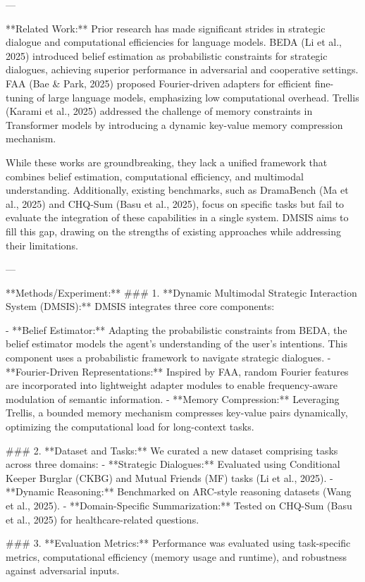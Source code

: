 ---

**Related Work:**  
Prior research has made significant strides in strategic dialogue and computational efficiencies for language models. BEDA (Li et al., 2025) introduced belief estimation as probabilistic constraints for strategic dialogues, achieving superior performance in adversarial and cooperative settings. FAA (Bae & Park, 2025) proposed Fourier-driven adapters for efficient fine-tuning of large language models, emphasizing low computational overhead. Trellis (Karami et al., 2025) addressed the challenge of memory constraints in Transformer models by introducing a dynamic key-value memory compression mechanism.

While these works are groundbreaking, they lack a unified framework that combines belief estimation, computational efficiency, and multimodal understanding. Additionally, existing benchmarks, such as DramaBench (Ma et al., 2025) and CHQ-Sum (Basu et al., 2025), focus on specific tasks but fail to evaluate the integration of these capabilities in a single system. DMSIS aims to fill this gap, drawing on the strengths of existing approaches while addressing their limitations.

---

**Methods/Experiment:**  
### 1. **Dynamic Multimodal Strategic Interaction System (DMSIS):**  
DMSIS integrates three core components:  

- **Belief Estimator:** Adapting the probabilistic constraints from BEDA, the belief estimator models the agent's understanding of the user's intentions. This component uses a probabilistic framework to navigate strategic dialogues.  
- **Fourier-Driven Representations:** Inspired by FAA, random Fourier features are incorporated into lightweight adapter modules to enable frequency-aware modulation of semantic information.  
- **Memory Compression:** Leveraging Trellis, a bounded memory mechanism compresses key-value pairs dynamically, optimizing the computational load for long-context tasks.  

### 2. **Dataset and Tasks:**  
We curated a new dataset comprising tasks across three domains:  
- **Strategic Dialogues:** Evaluated using Conditional Keeper Burglar (CKBG) and Mutual Friends (MF) tasks (Li et al., 2025).  
- **Dynamic Reasoning:** Benchmarked on ARC-style reasoning datasets (Wang et al., 2025).  
- **Domain-Specific Summarization:** Tested on CHQ-Sum (Basu et al., 2025) for healthcare-related questions.  

### 3. **Evaluation Metrics:**  
Performance was evaluated using task-specific metrics, computational efficiency (memory usage and runtime), and robustness against adversarial inputs.  

